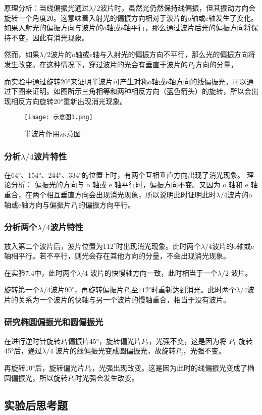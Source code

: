 \documentclass[dvipsnames, svgnames,a4paper,11pt]{article}
\begin{document}
	原理分析：当线偏振光通过$\lambda/2$波片时，虽然光仍然保持线偏振，但其振动方向会旋转一个角度2θ。这意味着入射光的偏振方向相对于波片的o轴或e轴发生了变化。如果入射光的偏振方向与波片的o轴或e轴平行，那么通过波片后光的偏振方向将保持不变，因此有消光现象。

	然而，如果$\lambda/2$波片的o轴或e轴与入射光的偏振方向不平行，那么光的偏振方向将发生改变。在这种情况下，穿过波片的光会有垂直于波片的$P_2$方向的分量，

	而实验中通过旋转20°来证明半波片可产生对称o轴或e轴方向的线偏振光，可以通过下图来证明。如图所示三角相等和两种相反方向（蓝色箭头）的旋转，所以会出现相反方向旋转20°重新出现消光现象。
	\begin{figure}[{H}]
		\centering
		\texttt{[image: 示意图1.png]}
		\caption{半波片作用示意图}
		\label{}
	\end{figure}
	\subsubsection{分析$\lambda/4$波片特性}
	在64°、154°、244°、334°的位置上时，有两个互相垂直方向出现了消光现象。
	理论分析： 偏振光的方向与 o 轴或 e 轴平行时，偏振方向不变。又因为 o 轴和 e 轴重合，在两个相互垂直方向会出现消光现象，所以说明此时证明此时$λ/4$波片的o轴或e轴方向与偏振片$P_1$的偏振方向平行。
	\subsubsection{分析两个$\lambda/4$波片特性}
	放入第二个波片后，波片位置为$112^\circ$时出现消光现象。此时两个$\lambda/4$波片的o轴或e轴相平行。若不平行，则光会存在其他方向的分量，不会出现消光现象。

	在实验7.4中，此时两个$\lambda/4$ 波片的快慢轴方向一致，此时相当于一个$\lambda/2$ 波片。

	旋转第一个$\lambda/4$波片$90^\circ$，再旋转偏振片$P_2$至$112^\circ$时重新达到消光。此时两个$\lambda/4$波片的关系为一个波片的快轴与另一个波片的慢轴重合，相当于没有波片。
	\subsubsection{研究椭圆偏振光和圆偏振光}
	在进行逆时针旋转$P_1$偏振片45°，旋转偏光片$P_2$，光强不变，这是因为将 $P_1$ 旋转 45°后，通过$\lambda /4$ 波片的线偏振光变成圆偏振光，故旋转$P_2$，光强不变。

	再旋转10°后，旋转偏光片$P_2$，光强出现改变。这是因为此时的线偏振光变成了椭圆偏振光，所以旋转$P_2$时光强会发生改变。
	\subsection{实验后思考题}
	
\end{document}

